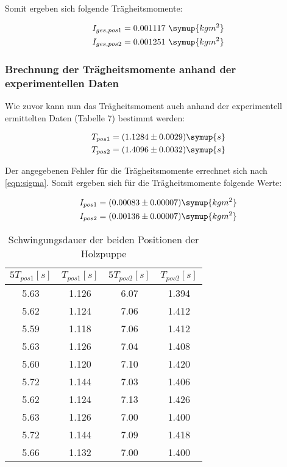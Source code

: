 Somit ergeben sich folgende Trägheitsmomente:

\begin{align}
  I_{ges,pos1} = 0.001117 \,\, \symup{kg m^2} \\
  I_{ges,pos2} = 0.001251 \,\, \symup{kg m^2}
\end{align}

\subsubsection{Brechnung der Trägheitsmomente anhand der experimentellen Daten}

Wie zuvor kann nun das Trägheitsmoment auch anhand der experimentell ermittelten Daten (Tabelle 7) bestimmt
werden:

\begin{align}
  T_{pos1} &= (1.1284 \pm 0.0029) \symup{s} \\
  T_{pos2} &= (1.4096 \pm 0.0032) \symup{s}
\end{align}

Der angegebenen Fehler für die Trägheitsmomente errechnet sich nach \eqref{eqn:sigma}.
Somit ergeben sich für die Trägheitsmomente folgende Werte:

\begin{align}
  I_{pos1} &= (0.00083 \pm 0.00007) \symup{kg m^2} \\
  I_{pos2} &= (0.00136 \pm 0.00007) \symup{kg m^2}
\end{align}

\begin{table}
  \centering
  \caption{Schwingungsdauer der beiden Positionen der Holzpuppe}
  \begin{tabular}{c c | c c}
    \toprule $5T_{pos1} [s]$ & $T_{pos1} [s]$ & $5T_{pos2} [s]$ & $T_{pos2} [s]$ \\
    \midrule
    5.63 & 1.126 & 6.07 & 1.394 \\
    5.62 & 1.124 & 7.06 & 1.412 \\
    5.59 & 1.118 & 7.06 & 1.412 \\
    5.63 & 1.126 & 7.04 & 1.408 \\
    5.60 & 1.120 & 7.10 & 1.420 \\
    5.72 & 1.144 & 7.03 & 1.406 \\
    5.62 & 1.124 & 7.13 & 1.426 \\
    5.63 & 1.126 & 7.00 & 1.400 \\
    5.72 & 1.144 & 7.09 & 1.418 \\
    5.66 & 1.132 & 7.00 & 1.400 \\
    \bottomrule
  \end{tabular}
\end{table}

